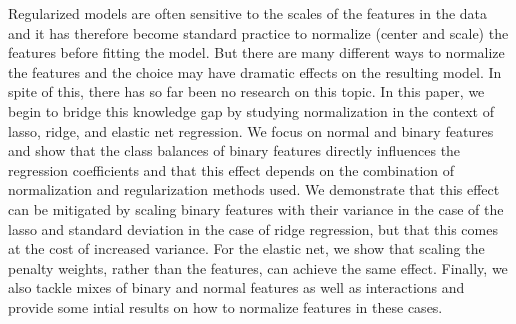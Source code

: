 Regularized models are often sensitive to the scales of the features in the data and it has
therefore become standard practice to normalize (center and scale) the features before
fitting the model. But there are many different ways to normalize the features and the
choice may have dramatic effects on the resulting model. In spite of this, there has so far
been no research on this topic. In this paper, we begin to bridge this knowledge gap by
studying normalization in the context of lasso, ridge, and elastic net regression. We focus
on normal and binary features and show that the class balances of binary features directly
influences the regression coefficients and that this effect depends on the combination of
normalization and regularization methods used. We demonstrate that this effect can be
mitigated by scaling binary features with their variance in the case of the lasso and
standard deviation in the case of ridge regression, but that this comes at the cost of
increased variance. For the elastic net, we show that scaling the penalty weights, rather
than the features, can achieve the same effect. Finally, we also tackle mixes of binary and
normal features as well as interactions and provide some intial results on how to normalize
features in these cases.

